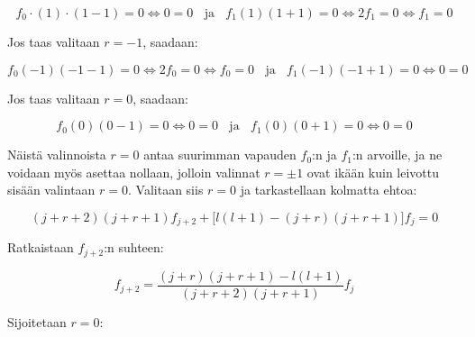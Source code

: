 \documentclass[../johdoksia.tex]{subfiles}
\begin{document}
	\begin{equation*}
		f_0\cdot(1)\cdot(1 - 1) = 0 \iff 0 = 0 \ \ \ \ \text{ja} \ \ \ \ f_1(1)(1 + 1) = 0 \iff 2f_1 = 0 \iff f_1 = 0
	\end{equation*} 

	Jos taas valitaan $r = -1$, saadaan: 
	
	\begin{equation*}
		f_0(-1)(-1-1) = 0 \iff 2f_0 = 0 \iff f_0 = 0 \ \ \ \ \text{ja} \ \ \ \ f_1(-1)(-1 + 1) = 0 \iff 0 = 0
	\end{equation*}
	
	Jos taas valitaan $r = 0$, saadaan:
	
	\begin{equation*}
		f_0(0)(0 - 1) = 0 \iff 0 = 0 \ \ \ \ \text{ja} \ \ \ \ f_1(0)(0 + 1) = 0 \iff 0 = 0
	\end{equation*}

	Näistä valinnoista $r = 0$ antaa suurimman vapauden $f_0$:n ja $f_1$:n arvoille, ja ne voidaan myös asettaa nollaan, jolloin valinnat $r = \pm 1$ ovat ikään kuin leivottu sisään valintaan $r = 0$. Valitaan siis $r = 0$ ja tarkastellaan kolmatta ehtoa: 
	
	\begin{equation*}
		(j + r + 2)(j + r + 1)f_{j + 2} + \Big[l(l + 1) - (j + r)(j + r + 1)\Big]f_{j} = 0
	\end{equation*}

	Ratkaistaan $f_{j + 2}$:n suhteen:
	
	\begin{equation*}
		f_{j + 2} = \frac{(j + r)(j + r + 1) - l(l + 1)}{(j + r + 2)(j + r + 1)}f_j
	\end{equation*}
	
	\begin{comment}
	Kun $r = 0$, kertoo $f_k$ $x^k$:ta. Koska $f_1 = 0$ menevät parittoman asteen termit nollaan. Kun taas $r = 1$, kertoo $f_k$ $x^{k + 1}$:tä. Koska $f_1 = 0$ menevät parillisen asteen termit nollaan, sillä esim. $f_1 = 0$ kertoo $x^{1 + 1} = x^2$:ta, $f_3 = 0$ kertoo $x^{3 + 1} = x^4$:ää ja niin edelleen. Rekursiorelaatio pysyy siis samana riippumatta siitä, onko $r = 0$ vai $1$. Se mikä muuttuu on se $x$:n potenssi jota kukin kerroin $f_k$ kertoo (Tarkempi todistus FyMM2a L5T3). Valitaan siis $r = 0$ ja jatketaan:
	\end{comment}
	
	\noindent Sijoitetaan $r = 0$:
	
\end{document}
